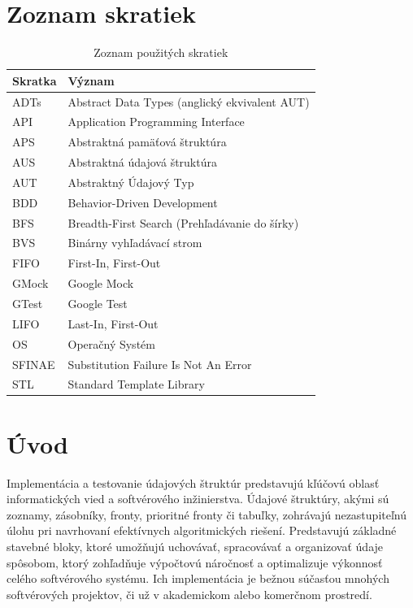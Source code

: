 \documentclass[11pt]{article}
\begin{document}
\section*{Zoznam skratiek}
\begin{table}[H]
  \centering
  \begin{tabularx}{\textwidth}{>{\raggedright\arraybackslash}X>{\raggedright\arraybackslash}X}
   \toprule
   \textbf{Skratka} & \textbf{Význam} \\
   \midrule
   ADTs & Abstract Data Types (anglický ekvivalent AUT) \\
   \midrule
   API & Application Programming Interface \\
   \midrule
   APS & Abstraktná pamäťová štruktúra \\
   \midrule
   AUS & Abstraktná údajová štruktúra \\
   \midrule
   AUT & Abstraktný Údajový Typ \\
   \midrule
   BDD & Behavior-Driven Development \\
   \midrule
   BFS & Breadth-First Search (Prehľadávanie do šírky) \\
   \midrule
   BVS & Binárny vyhľadávací strom \\
   \midrule
   FIFO & First-In, First-Out \\
   \midrule
   GMock & Google Mock \\
   \midrule
   GTest & Google Test \\
   \midrule
   LIFO & Last-In, First-Out \\
   \midrule
   OS & Operačný Systém \\
   \midrule
   SFINAE & Substitution Failure Is Not An Error \\
   \midrule
   STL & Standard Template Library \\
   \bottomrule
  \end{tabularx}
  \caption{Zoznam použitých skratiek}
  \label{tab:skratky}
 \end{table}

\newpage

\section*{Úvod}
Implementácia a testovanie údajových štruktúr predstavujú kľúčovú oblasť informatických vied a softvérového inžinierstva. Údajové štruktúry, akými sú zoznamy, zásobníky, fronty, prioritné fronty či tabuľky, zohrávajú nezastupiteľnú úlohu pri navrhovaní efektívnych algoritmických riešení. Predstavujú základné stavebné bloky, ktoré umožňujú uchovávať, spracovávať a organizovať údaje spôsobom, ktorý zohľadňuje výpočtovú náročnosť a optimalizuje výkonnosť celého softvérového systému. Ich implementácia je bežnou súčasťou mnohých softvérových projektov, či už v akademickom alebo komerčnom prostredí.
\end{document}
